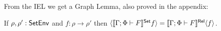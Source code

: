 \documentclass[runningheads]{llncs}
\renewcommand{\id}{\mathit{id}}
\renewcommand{\id}{\mathit{id}}
\begin{document}
From the IEL we get a Graph Lemma, {\color{red} also proved in the
  appendix:} 
\begin{lemma}%
  \label{lem:graph}
  If $\rho, \rho' : \mathsf{SetEnv}$ and $f : \rho \to \rho'$
  then $\langle {\llbracket{\Gamma; \Phi \vdash F}\rrbracket^{\mathsf{Set}}f} \rangle =
\llbracket{\Gamma; \Phi \vdash F}\rrbracket^{\mathsf{Rel}}\langle {f} \rangle$.
\end{lemma}
\begin{comment}
\begin{proof}
Applying Equation~\ref{lem:rel-transf-morph} to the morphisms $(f,
\id_{\rho'}) : \graph{f} \to \Eq_{\rho'}$ and $(\id_{\rho}, f) :
\Eq_{\rho} \to \graph{f}$ of relation environments gives that
$(\setsem{\Gamma; \Phi \vdash F}f, \setsem{\Gamma; \Phi \vdash
  F}\id_{\rho'}) = \relsem{\Gamma; \Phi \vdash F} (f, \id_{\rho'}) :
\relsem{\Gamma; \Phi \vdash F}\graph{f} \to \relsem{\Gamma; \Phi
  \vdash F}\Eq_{\rho'}$ and $(\setsem{\Gamma; \Phi \vdash
  F}\id_{\rho}, \setsem{\Gamma; \Phi \vdash F}f) = \relsem{\Gamma;
  \Phi \vdash F} (\id_{\rho}, f) : \relsem{\Gamma; \Phi \vdash
  F}\Eq_{\rho} \to \relsem{\Gamma; \Phi \vdash F}\graph{f}$.
Expanding the first equation gives that if $(x,y) \in \relsem{\Gamma;
  \Phi \vdash F}\graph{f}$ then $(\setsem{\Gamma; \Phi \vdash F} f\,
x, \setsem{\Gamma; \Phi \vdash F}\id_{\rho'}\, y) \in \relsem{\Gamma;
  \Phi \vdash F}\Eq_{\rho'}$. So $\setsem{\Gamma; \Phi \vdash
  F}\id_{\rho'}\, y = \id_{\setsem{\Gamma; \Phi \vdash F}\rho'}\, y =
y$ and $\relsem{\Gamma; \Phi \vdash F}\Eq_{\rho'} =
\Eq_{\setsem{\Gamma; \Phi \vdash F}\rho'}$, and if $(x,y) \in
\relsem{\Gamma; \Phi \vdash F}\graph{f}$ then $(\setsem{\Gamma; \Phi
  \vdash F} f\, x, y) \in \Eq_{\setsem{\Gamma; \Phi \vdash F}\rho'}$,
i.e., $\setsem{\Gamma; \Phi \vdash F} f\, x = y$, i.e., $(x, y) \in
\graph{\setsem{\Gamma; \Phi \vdash F} f}$.  So, we have that
$\relsem{\Gamma; \Phi \vdash F}\graph{f} \subseteq
\graph{\setsem{\Gamma; \Phi \vdash F}f}$.  Expanding the second
equation gives that if $x \in \setsem{\Gamma; \Phi \vdash F}\rho$ then
$(\setsem{\Gamma; \Phi \vdash F}\id_{\rho}\, x,$\\
$\setsem{\Gamma; \Phi
  \vdash F} f\, x) \in \relsem{\Gamma; \Phi \vdash F}\graph{f}$.  Then
$\setsem{\Gamma; \Phi \vdash F}\id_{\rho}\, x = \id_{\setsem{\Gamma;
    \Phi \vdash F}\rho} x = x$, so for any $x \in \setsem{\Gamma; \Phi
  \vdash F}\rho$ we have that $(x, \setsem{\Gamma; \Phi \vdash F}f\,
x) \in \relsem{\Gamma; \Phi \vdash F}\graph{f}$.  Moreover, $x \in
\setsem{\Gamma; \Phi \vdash F}\rho$ if and only if $(x,
\setsem{\Gamma; \Phi \vdash F} f\, x) \in \graph{\setsem{\Gamma; \Phi
    \vdash F}f}$ and, if $x \in \setsem{\Gamma; \Phi \vdash F}\rho$
then $(x, \setsem{\Gamma; \Phi \vdash F} f\, x) \in \relsem{\Gamma;
  \Phi \vdash F} \graph{f}$, so if $(x, \setsem{\Gamma; \Phi \vdash F}
f\, x) \in \graph{\setsem{\Gamma; \Phi \vdash F}f}$ then $(x,
\setsem{\Gamma; \Phi \vdash F} f\, x) \in \relsem{\Gamma; \Phi \vdash
  F} \graph{f}$, i.e., $\graph{\setsem{\Gamma; \Phi \vdash F}f}
\subseteq \relsem{\Gamma; \Phi \vdash F} \graph{f}$.
\end{proof}
\end{comment}
\end{document}
